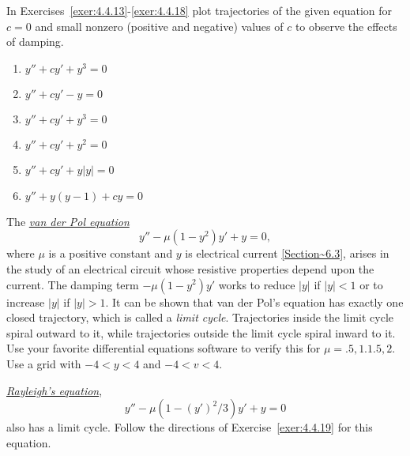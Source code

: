 \documentclass{ximera}
\begin{document}
\begin{problem}
In Exercises~\ref{exer:4.4.13}-\ref{exer:4.4.18}
plot trajectories of the given equation for $c=0$ and small nonzero
(positive and negative) values of $c$ to observe the effects of
damping.

\begin{enumerate}
\item\label{exer:4.4.13} $y''+cy'+y^3=0$
\item\label{exer:4.4.14} $y''+cy'-y=0$
\item\label{exer:4.4.15} $y''+cy'+y^3=0$
\item\label{exer:4.4.16} $y''+cy'+y^2=0$
\item\label{exer:4.4.17} $y''+cy'+y|y|=0$
\item\label{exer:4.4.18} $y''+y(y-1)+cy=0$
\end{enumerate}
\end{problem}

\begin{problem}\label{exer:4.4.19} 
The \href{http://www-history.mcs.st-and.ac.uk/Mathematicians/Van_der_Pol.html}
{\emph{van der Pol equation}}
\begin{equation}\label{eqA:4.4.19}
y''-\mu(1-y^2)y'+y=0,
\end{equation}
where $\mu$ is a positive constant and $y$ is electrical current
\ref{Section~6.3}, arises in the study of an electrical circuit
whose resistive properties depend upon the current. The damping term
$-\mu(1-y^2)y'$ works to reduce $|y|$ if $|y|<1$ or to increase $|y|$
if
$|y|>1$. It can be shown that van der
Pol's equation has exactly one closed trajectory, which is called a
\emph{limit cycle}. Trajectories inside the limit cycle spiral
outward to it, while trajectories outside the limit cycle spiral
inward to it. 
Use your favorite differential equations software  to verify this for
$\mu=.5,1.1.5,2$. Use a grid with $-4<y<4$ and $-4<v<4$.

\end{problem}


\begin{problem}\label{exer:4.4.20}  
\href{http://www-history.mcs.st-and.ac.uk/Mathematicians/Rayleigh.html}
{\emph{Rayleigh's equation}},
$$
y''-\mu(1-(y')^2/3)y'+y=0
$$
also has a limit cycle. Follow the directions of
Exercise~\ref{exer:4.4.19} for this equation.
\end{problem}
\end{document}
